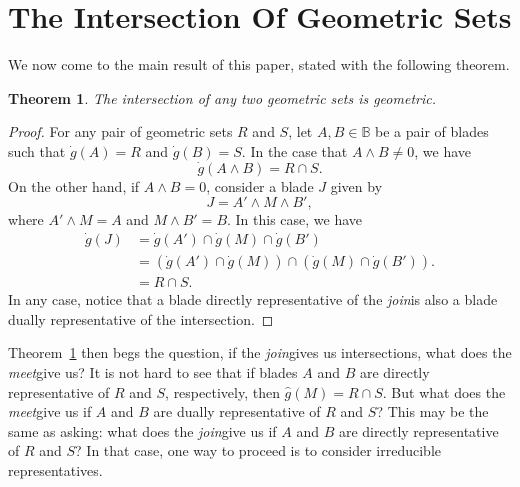 \documentclass{birkjour}
\newtheorem{thm}{Theorem}[section]
\theoremstyle{definition}
\theoremstyle{remark}
\numberwithin{equation}{section}
\newcommand{\B}{\mathbb{B}}
\newcommand{\gd}{\dot{g}}
\newcommand{\gh}{\hat{g}}
\newcommand{\meet}{{\it meet}\;}
\newcommand{\join}{{\it join}\;}
\begin{document}

\section{The Intersection Of Geometric Sets}

We now come to the main result of this paper, stated with the following theorem.

\begin{thm}
The intersection of any two geometric sets is geometric.
\end{thm}
\begin{proof}
For any pair of geometric sets $R$ and $S$, let $A,B\in\B$ be a pair of blades
such that $\gd(A)=R$ and $\gd(B)=S$.  In the case that $A\wedge B\neq 0$,
we have
\begin{equation}
\gd(A\wedge B)=R\cap S.
\end{equation}
On the other hand, if $A\wedge B=0$, consider a blade $J$ given by
\begin{equation}
J = A'\wedge M\wedge B',
\end{equation}
where $A'\wedge M=A$ and $M\wedge B'=B$.  In this case, we have
\begin{align}
\gd(J) &= \gd(A')\cap\gd(M)\cap\gd(B') \\
 &=(\gd(A')\cap\gd(M))\cap(\gd(M)\cap\gd(B')). \\
 &= R\cap S.
\end{align}
In any case, notice that a blade directly representative of the \join is also a blade dually
representative of the intersection.
\end{proof}

Theorem~\ref{} then begs the question, if the \join gives us intersections, what
does the \meet give us?  It is not hard to see that if blades $A$ and $B$ are directly
representative of $R$ and $S$, respectively, then $\gh(M)=R\cap S$.  But what
does the \meet give us if $A$ and $B$ are dually representative of $R$ and $S$?
This may be the same as asking: what does the \join give us if $A$ and $B$ are directly
representative of $R$ and $S$?  In that case, one way to proceed is to consider
irreducible representatives.
\end{document}
